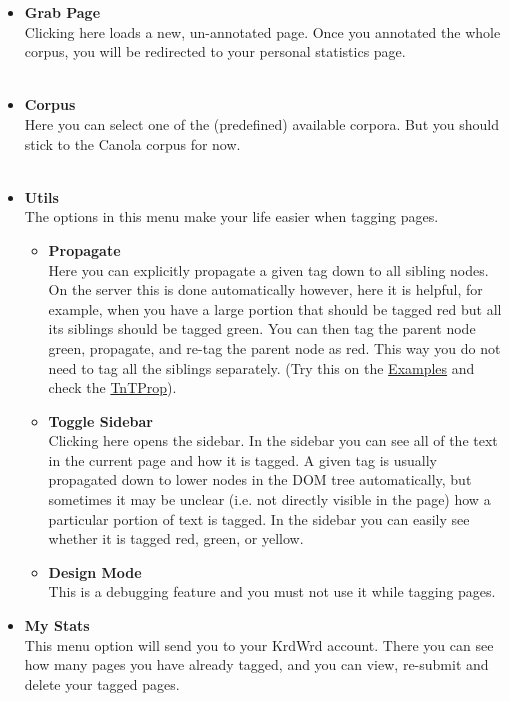 \documentclass[12pt,a4paper]{article}
\begin{document}
\begin{itemize}
	\item {\large \textbf{Grab Page}}\\
Clicking here loads a new, un-annotated page. Once you annotated the whole corpus, you will be redirected to your personal statistics page. \\ \\
	\item {\large \textbf{Corpus}}\\
Here you can select one of the (predefined) available corpora. But you should stick to the Canola corpus for now.\\ \\
	\item {\large \textbf{Utils}}\\
The options in this menu make your life easier when tagging pages. \\
	\begin{itemize}
		\item {\large \textbf{Propagate}}\\
Here you can explicitly propagate a given tag down to all sibling nodes. On the server this is done automatically however, here it is helpful, for example, when you have a large portion that should be tagged red but all its siblings should be tagged green. You can then tag the parent node green, propagate, and re-tag the parent node as red. This way you do not need to tag all the siblings separately. (Try this on the \hyperref{Examples}{Examples, described in~}{}{Examples} and check the \hyperref{Tips \& Tricks}{Tips \& Tricks, ~}{}{TnTProp}).
		\item {\large \textbf{Toggle Sidebar}}\\
Clicking here opens the sidebar. In the sidebar you can see all of the text in the current page and how it is tagged. A given tag is usually propagated down to lower nodes in the DOM tree automatically, but sometimes it may be unclear (i.e. not directly visible in the page) how a particular portion of text is tagged. In the sidebar you can easily see whether it is tagged red, green, or yellow.
		\item {\large \textbf{Design Mode}}\\
This is a debugging feature and you must not use it while tagging pages. \\
	\end{itemize}
	\item {\large \textbf{My Stats}}\\
This menu option will send you to your KrdWrd account. There you can see how many pages you have already tagged, and you can view, re-submit and delete your tagged pages. 
\end {itemize}
\end{document}
